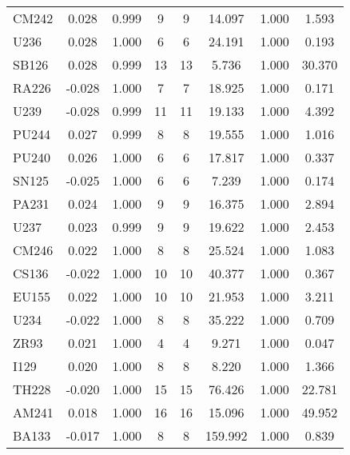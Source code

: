 \begin{tabular}{|l|ccccccc|}
CM242 & 0.028 & 0.999 & 9 & 9 & 14.097 & 1.000 & 1.593\\
U236 & 0.028 & 1.000 & 6 & 6 & 24.191 & 1.000 & 0.193\\
SB126 & 0.028 & 0.999 & 13 & 13 & 5.736 & 1.000 & 30.370\\
RA226 & -0.028 & 1.000 & 7 & 7 & 18.925 & 1.000 & 0.171\\
U239 & -0.028 & 0.999 & 11 & 11 & 19.133 & 1.000 & 4.392\\
PU244 & 0.027 & 0.999 & 8 & 8 & 19.555 & 1.000 & 1.016\\
PU240 & 0.026 & 1.000 & 6 & 6 & 17.817 & 1.000 & 0.337\\
SN125 & -0.025 & 1.000 & 6 & 6 & 7.239 & 1.000 & 0.174\\
PA231 & 0.024 & 1.000 & 9 & 9 & 16.375 & 1.000 & 2.894\\
U237 & 0.023 & 0.999 & 9 & 9 & 19.622 & 1.000 & 2.453\\
CM246 & 0.022 & 1.000 & 8 & 8 & 25.524 & 1.000 & 1.083\\
CS136 & -0.022 & 1.000 & 10 & 10 & 40.377 & 1.000 & 0.367\\
EU155 & 0.022 & 1.000 & 10 & 10 & 21.953 & 1.000 & 3.211\\
U234 & -0.022 & 1.000 & 8 & 8 & 35.222 & 1.000 & 0.709\\
ZR93 & 0.021 & 1.000 & 4 & 4 & 9.271 & 1.000 & 0.047\\
I129 & 0.020 & 1.000 & 8 & 8 & 8.220 & 1.000 & 1.366\\
TH228 & -0.020 & 1.000 & 15 & 15 & 76.426 & 1.000 & 22.781\\
AM241 & 0.018 & 1.000 & 16 & 16 & 15.096 & 1.000 & 49.952\\
BA133 & -0.017 & 1.000 & 8 & 8 & 159.992 & 1.000 & 0.839\\
\hline
\end{tabular}